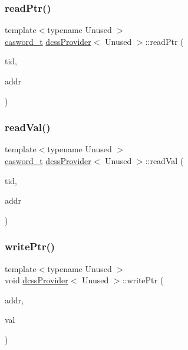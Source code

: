 \mbox{\label{classdcssProvider_a30a5b9836f756836dcf4a40b673f491e}} 
\subsubsection{\texorpdfstring{read\+Ptr()}{readPtr()}}
{\footnotesize\ttfamily template$<$typename Unused $>$ \\
\hyperlink{rq__unsafe_8h_ad45142aaf2ff20a036dc6242b8483e9c}{casword\+\_\+t} \hyperlink{classdcssProvider}{dcss\+Provider}$<$ Unused $>$\+::read\+Ptr (\begin{DoxyParamCaption}\item[{const int}]{tid,  }\item[{\hyperlink{rq__unsafe_8h_ad45142aaf2ff20a036dc6242b8483e9c}{casword\+\_\+t} volatile $\ast$}]{addr }\end{DoxyParamCaption})\hspace{0.3cm}{\ttfamily [inline]}}

\mbox{\label{classdcssProvider_a147a9e2e8a48645cbc81517852437c7b}} 
\subsubsection{\texorpdfstring{read\+Val()}{readVal()}}
{\footnotesize\ttfamily template$<$typename Unused $>$ \\
\hyperlink{rq__unsafe_8h_ad45142aaf2ff20a036dc6242b8483e9c}{casword\+\_\+t} \hyperlink{classdcssProvider}{dcss\+Provider}$<$ Unused $>$\+::read\+Val (\begin{DoxyParamCaption}\item[{const int}]{tid,  }\item[{\hyperlink{rq__unsafe_8h_ad45142aaf2ff20a036dc6242b8483e9c}{casword\+\_\+t} volatile $\ast$}]{addr }\end{DoxyParamCaption})}

\mbox{\label{classdcssProvider_a0f37db9b12dccc452281eb40486c5050}} 
\subsubsection{\texorpdfstring{write\+Ptr()}{writePtr()}}
{\footnotesize\ttfamily template$<$typename Unused $>$ \\
void \hyperlink{classdcssProvider}{dcss\+Provider}$<$ Unused $>$\+::write\+Ptr (\begin{DoxyParamCaption}\item[{\hyperlink{rq__unsafe_8h_ad45142aaf2ff20a036dc6242b8483e9c}{casword\+\_\+t} volatile $\ast$}]{addr,  }\item[{\hyperlink{rq__unsafe_8h_ad45142aaf2ff20a036dc6242b8483e9c}{casword\+\_\+t}}]{val }\end{DoxyParamCaption})}


